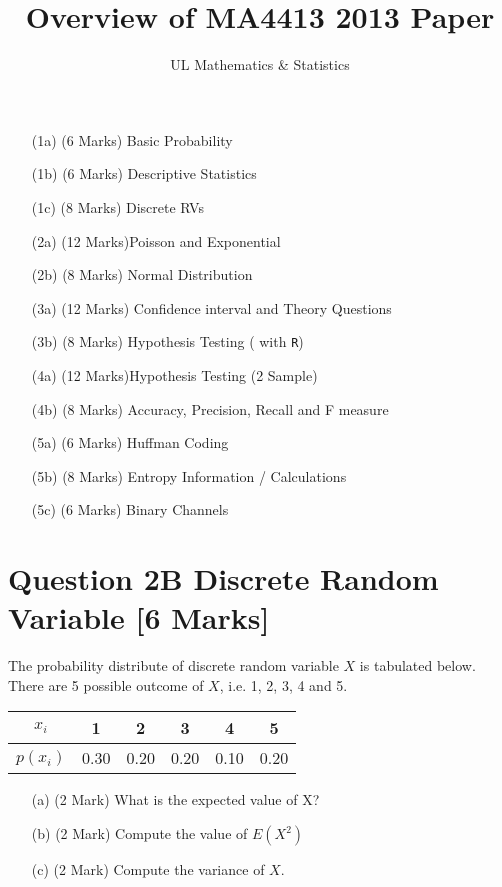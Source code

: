 \documentclass[]{article}
\title{Overview of MA4413 2013 Paper}
\author{UL Mathematics \& Statistics}
\begin{document}
\maketitle

\begin{itemize}
\item[(1a)] (6 Marks) Basic Probability
\item[(1b)] (6 Marks) Descriptive Statistics
\item[(1c)] (8 Marks) Discrete RVs
\item[(2a)] (12 Marks)Poisson and Exponential
\item[(2b)] (8 Marks) Normal Distribution
\item[(3a)] (12 Marks) Confidence interval and Theory Questions
\item[(3b)] (8 Marks) Hypothesis Testing ( with \texttt{R})
\item[(4a)] (12 Marks)Hypothesis Testing (2 Sample)
\item[(4b)] (8 Marks) Accuracy, Precision, Recall and F measure
\item[(5a)] (6 Marks) Huffman Coding
\item[(5b)] (8 Marks) Entropy Information / Calculations
\item[(5c)] (6 Marks) Binary Channels
\end{itemize}
\newpage
\section*{Question 2B Discrete Random Variable [6 Marks]}
The probability distribute of discrete random variable $X$ is tabulated below. There are 5 possible outcome of $X$, i.e. 1, 2, 3, 4 and 5.
\begin{center}
\begin{tabular}{|c||c|c|c|c|c|}
\hline
$x_i$  & 1 & 2 & 3 & 4 & 5  \\\hline
$p(x_i)$ & 0.30 & 0.20 & 0.20 & 0.10 & 0.20 \\
\hline
\end{tabular}
\end{center}

\begin{itemize}
\item[(a)] (2 Mark) What is the expected value of X?
\item[(b)] (2 Mark) Compute the value of $E(X^2)$
\item[(c)] (2 Mark) Compute the variance of $X$.
\end{itemize}
\newpage
\end{document}
